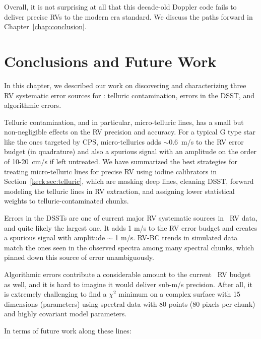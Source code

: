 Overall, it is not surprising at all that this decade-old Doppler code
fails to deliver precise RVs to the modern era standard. We discuss
the paths forward in Chapter~\ref{chap:conclusion}.



\section{Conclusions and Future Work}\label{keck:sec:conclusion}

In this chapter, we described our work on discovering and
characterizing three RV systematic error sources for \keck: telluric
contamination, errors in the DSST, and algorithmic errors. 

Telluric contamination, and in particular, micro-telluric lines, has a
small but non-negligible effects on the RV precision and accuracy. For
a typical G type star like the ones targeted by CPS, micro-tellurics
adds $\sim 0.6$~m/s to the RV error budget (in quadrature) and also a
spurious signal with an amplitude on the order of 10-20~cm/s if left
untreated. We have summarized the best strategies for treating
micro-telluric lines for precise RV using iodine calibrators in
Section~\ref{keck:sec:telluric}, which are masking deep lines,
cleaning DSST, forward modeling the telluric lines in RV extraction,
and assigning lower statistical weights to telluric-contaminated
chunks.

Errors in the DSSTs are one of current major RV systematic sources in
\keck\ RV data, and quite likely the largest one. It adds 1 m/s to the
RV error budget and creates a spurious signal with amplitude $\sim$ 1
m/s. RV-BC trends in simulated data match the ones seen in the
observed spectra among many spectral chunks, which pinned down this
source of error unambiguously. 

Algorithmic errors contribute a considerable amount to the current
\keck\ RV budget as well, and it is hard to imagine it would deliver
sub-m/s precision. After all, it is extremely challenging to find a
$\chi^2$ minimum on a complex surface with 15 dimensions (parameters)
using spectral data with 80 points (80 pixels per chunk) and
highly covariant model parameters. 

In terms of future work along these lines:

